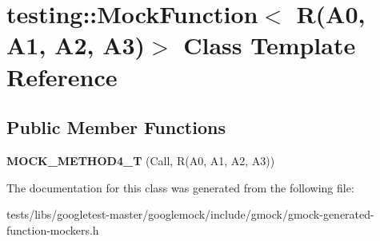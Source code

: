 \hypertarget{classtesting_1_1MockFunction_3_01R_07A0_00_01A1_00_01A2_00_01A3_08_4}{}\section{testing\+:\+:Mock\+Function$<$ R(A0, A1, A2, A3)$>$ Class Template Reference}
\label{classtesting_1_1MockFunction_3_01R_07A0_00_01A1_00_01A2_00_01A3_08_4}
\subsection*{Public Member Functions}
\begin{DoxyCompactItemize}
\item 
\mbox{\label{classtesting_1_1MockFunction_3_01R_07A0_00_01A1_00_01A2_00_01A3_08_4_ad158c25a1b33cb53bae3f0eb9df0d59c}} 
{\bfseries M\+O\+C\+K\+\_\+\+M\+E\+T\+H\+O\+D4\+\_\+T} (Call, R(A0, A1, A2, A3))
\end{DoxyCompactItemize}


The documentation for this class was generated from the following file\+:\begin{DoxyCompactItemize}
\item 
tests/libs/googletest-\/master/googlemock/include/gmock/gmock-\/generated-\/function-\/mockers.\+h\end{DoxyCompactItemize}
